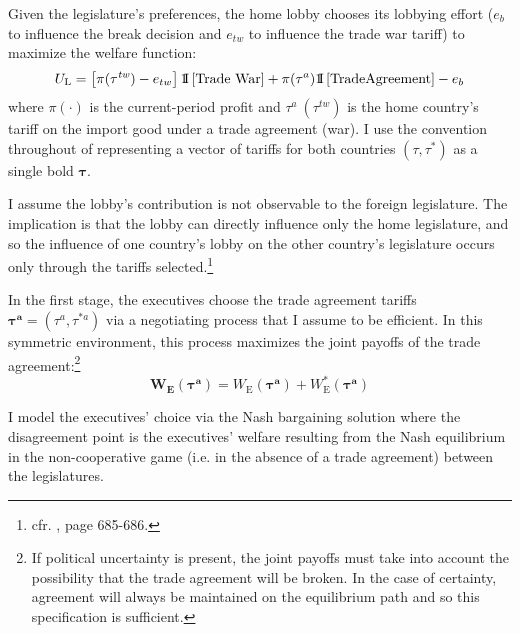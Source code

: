 \documentclass[authoryear, review]{elsarticle}
\newcommand{\bta}{\bm{\tau^a}}
\begin{document}
Given the legislature's preferences, the home lobby chooses its lobbying effort ($e_b$ to influence the break decision and $e_{tw}$ to influence the trade war tariff) to maximize the welfare function:
\begin{equation}
  U_\text{L} = \left[ \pi(\tau^{\mathit{tw}}) - e_{tw} \right]1{\hskip -2.5 pt}\hbox{I} \left[ \text{Trade War} \right] + \pi(\tau^a)1{\hskip -2.5 pt}\hbox{I} \left[ \text{TradeAgreement} \right]  - e_b
  \label{eq:lv3}
\end{equation}
where $\pi(\cdot)$ is the current-period profit and $\tau^a \ (\tau^\mathit{tw})$ is the home country's tariff on the import good under a trade agreement (war). I use the convention throughout of representing a vector of tariffs for both countries $(\tau,\tau^*)$ as a single bold $\bm{\tau}$. 

I assume the lobby's contribution is not observable to the foreign legislature. The implication is that the lobby can directly influence only the home legislature, and so the influence of one country's lobby on the other country's legislature occurs only through the tariffs selected.\footnote{cfr. \citet{gh95}, page 685-686.}

In the first stage, the executives choose the trade agreement tariffs $\bta=\left(\tau^a,\tau^{*a} \right)$ via a negotiating process that I assume to be efficient. In this symmetric environment, this process maximizes the joint payoffs of the trade agreement:\footnote{If political uncertainty is present, the joint payoffs must take into account the possibility that the trade agreement will be broken. In the case of certainty, agreement will always be maintained on the equilibrium path and so this specification is sufficient.}
\begin{equation}
  \bm{W_\text{E}}(\bta) = W_\text{E}(\bta) + W_\text{E}^*(\bta)
  \label{eq:jv3}
\end{equation}

I model the executives' choice via the Nash bargaining solution where the disagreement point is the executives' welfare resulting from the Nash equilibrium in the non-cooperative game (i.e. in the absence of a trade agreement) between the legislatures.
\end{document}
